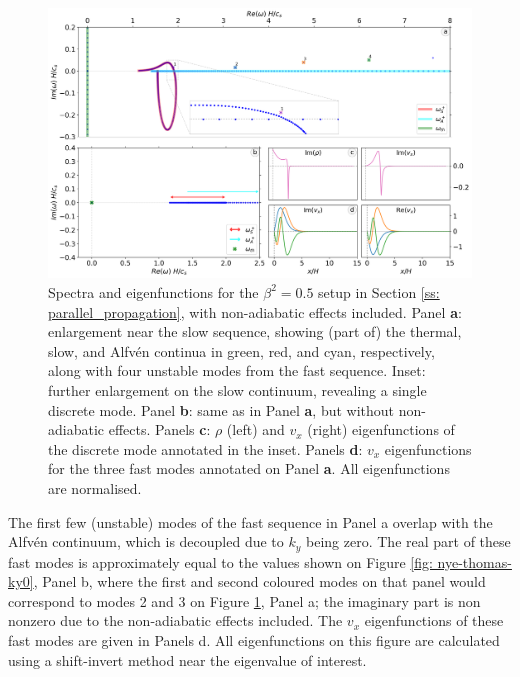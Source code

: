 \begin{figure}[t]
  \centering
  \includegraphics[width=\textwidth]{nye_thomas_nonadiabatic.png}
  \caption{
    Spectra and eigenfunctions for the $\beta^2 = 0.5$ setup in Section \ref{ss: parallel_propagation}, with non-adiabatic effects included. Panel \textbf{a}: enlargement near the slow sequence, showing (part of) the thermal, slow, and Alfv\'en continua in green, red, and cyan, respectively, along with four unstable modes from the fast sequence. Inset: further enlargement on the slow continuum, revealing a single discrete mode.
    Panel \textbf{b}: same as in Panel \textbf{a}, but without non-adiabatic effects. Panels \textbf{c}: $\rho$ (left) and $v_x$ (right) eigenfunctions of the discrete mode annotated in the inset. Panels \textbf{d}: $v_x$ eigenfunctions for the three fast modes annotated on Panel \textbf{a}. All eigenfunctions are normalised.
  }
  \label{fig: nye-thomas-nonadiabatic}
\end{figure}

The first few (unstable) modes of the fast sequence in Panel a overlap with the Alfv\'en continuum, which is decoupled due to $k_y$ being zero. The real part of these fast modes is approximately equal to the values shown on Figure \ref{fig: nye-thomas-ky0}, Panel b, where the first and second coloured modes on that panel would correspond to modes 2 and 3 on Figure \ref{fig: nye-thomas-nonadiabatic}, Panel a; the imaginary part is non nonzero due to the non-adiabatic effects included. The $v_x$ eigenfunctions of these fast modes are given in Panels d. All eigenfunctions on this figure are calculated using a shift-invert method near the eigenvalue of interest.

